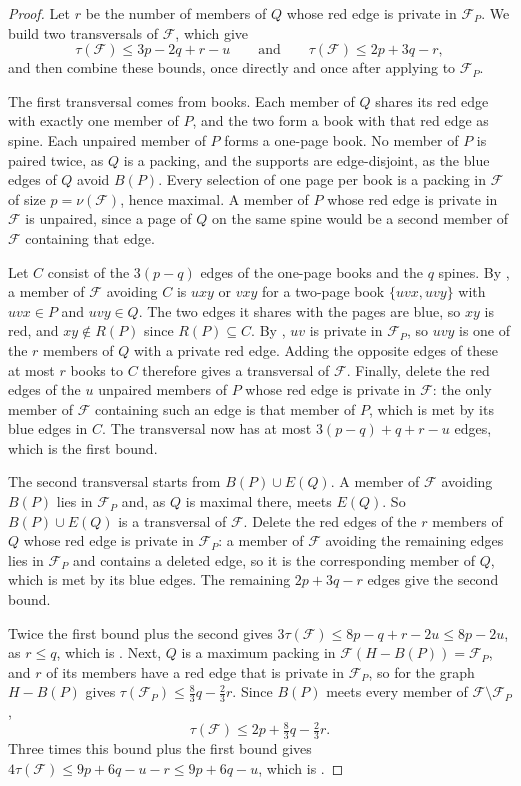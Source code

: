 \documentclass[11pt]{article}
\theoremstyle{remark}
\newcommand{\F}{\mathcal F}
\begin{document}
\begin{proof}
Let $r$ be the number of members of $Q$ whose red edge is private in $\F_P$. We build two transversals of $\F$, which give
\[
 \tau(\F)\le3p-2q+r-u
 \qquad\text{and}\qquad
 \tau(\F)\le2p+3q-r,
\]
and then combine these bounds, once directly and once after applying  to $\F_P$.

The first transversal comes from books. Each member of $Q$ shares its red edge with exactly one member of $P$, and the two form a book with that red edge as spine. Each unpaired member of $P$ forms a one-page book. No member of $P$ is paired twice, as $Q$ is a packing, and the supports are edge-disjoint, as the blue edges of $Q$ avoid $B(P)$. Every selection of one page per book is a packing in $\F$ of size $p=\nu(\F)$, hence maximal. A member of $P$ whose red edge is private in $\F$ is unpaired, since a page of $Q$ on the same spine would be a second member of $\F$ containing that edge.

Let $C$ consist of the $3(p-q)$ edges of the one-page books and the $q$ spines. By , a member of $\F$ avoiding $C$ is $uxy$ or $vxy$ for a two-page book $\{uvx,uvy\}$ with $uvx\in P$ and $uvy\in Q$. The two edges it shares with the pages are blue, so $xy$ is red, and $xy\notin R(P)$ since $R(P)\subseteq C$. By , $uv$ is private in $\F_P$, so $uvy$ is one of the $r$ members of $Q$ with a private red edge. Adding the opposite edges of these at most $r$ books to $C$ therefore gives a transversal of $\F$. Finally, delete the red edges of the $u$ unpaired members of $P$ whose red edge is private in $\F$: the only member of $\F$ containing such an edge is that member of $P$, which is met by its blue edges in $C$. The transversal now has at most $3(p-q)+q+r-u$ edges, which is the first bound.

The second transversal starts from $B(P)\cup E(Q)$. A member of $\F$ avoiding $B(P)$ lies in $\F_P$ and, as $Q$ is maximal there, meets $E(Q)$. So $B(P)\cup E(Q)$ is a transversal of $\F$. Delete the red edges of the $r$ members of $Q$ whose red edge is private in $\F_P$: a member of $\F$ avoiding the remaining edges lies in $\F_P$ and contains a deleted edge, so it is the corresponding member of $Q$, which is met by its blue edges. The remaining $2p+3q-r$ edges give the second bound.

Twice the first bound plus the second gives $3\tau(\F)\le8p-q+r-2u\le8p-2u$, as $r\le q$, which is . Next, $Q$ is a maximum packing in $\F(H-B(P))=\F_P$, and $r$ of its members have a red edge that is private in $\F_P$, so  for the graph $H-B(P)$ gives $\tau(\F_P)\le\tfrac83q-\tfrac23r$. Since $B(P)$ meets every member of $\F\setminus\F_P$,
\[
 \tau(\F)\le2p+\tfrac83q-\tfrac23r.
\]
Three times this bound plus the first bound gives $4\tau(\F)\le9p+6q-u-r\le9p+6q-u$, which is .
\end{proof}
\end{document}

